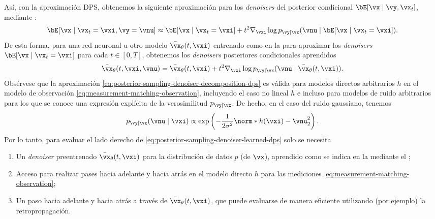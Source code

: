 \documentclass[../../book-main_es.tex]{subfiles}
\begin{document}
Así, con la aproximación DPS, obtenemos la siguiente aproximación para
los \textit{denoisers} del posterior condicional $\bE[\vx \mid \vy, \vx_t]$, mediante
:
\begin{equation}
    \bE[ \vx \mid \vx_t=\vxi, \vy=\vnu]
    \approx
    \bE[\vx \mid \vx_t=\vxi]
    + t^2 \nabla_{\vxi} \log p_{\vy \mid \vx}(\vnu \mid \bE[\vx \mid
    \vx_t = \vxi]).
    \label{eq:posterior-sampling-denoiser-decomposition-dps}
\end{equation}
De esta forma, para una red neuronal u otro modelo $\bar{\vx}_{\theta}(t, \vxi)$
entrenado como en la  para aproximar los \textit{denoisers} 
$\bE[\vx \mid \vx_t = \vxi]$ para cada $t \in [0, T]$, obtenemos los \textit{denoisers} 
posteriores condicionales aprendidos
\begin{equation}
    \bar{\vx}_{\theta}(t, \vxi, \vnu)
    = \bar{\vx}_{\theta}(t, \vxi)
    + t^2 \nabla_{\vxi} \log p_{\vy \mid \vx}(\vnu \mid \bar{\vx}_{\theta}(t,
    \vxi)).
    \label{eq:posterior-sampling-denoiser-learned-dps}
\end{equation}
Obsérvese que la aproximación
\eqref{eq:posterior-sampling-denoiser-decomposition-dps} es válida para modelos directos arbitrarios
$h$ en el
modelo de observación \eqref{eq:measurement-matching-observation}, incluyendo el caso no lineal
$h$ e incluso para
modelos de ruido arbitrarios para los que se conoce una expresión explícita de la verosimilitud $p_{\vy
\mid \vx}$. De hecho, en el caso del ruido gaussiano, tenemos
\begin{equation}
    p_{\vy \mid \vx}(\vnu \mid \vxi)
    \propto
    \exp\left(
        -\frac{1}{2\sigma^2} \norm*{ h(\vxi) - \vnu }_2^2
    \right).
\end{equation}
Por lo tanto, para evaluar el lado derecho de
\eqref{eq:posterior-sampling-denoiser-learned-dps}
solo se necesita
\begin{enumerate}
    \item Un \textit{denoiser} preentrenado $\bar{\vx}_{\theta}(t, \vxi)$ para la
        distribución de datos $p$
        (de $\vx$), aprendido como se indica en la  mediante el
        ;
    \item Acceso para realizar pases hacia adelante y hacia atrás en el modelo directo $h$ para las
        mediciones \eqref{eq:measurement-matching-observation};
    \item Un paso hacia adelante y hacia atrás a través de $\bar{\vx}_{\theta}(t,
        \vxi)$, que puede evaluarse
        de manera eficiente utilizando (por ejemplo) la retropropagación.
\end{enumerate}
\end{document}
